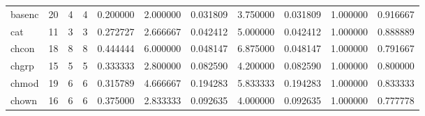 \begin{tabular}{lrrrrrrrrrr}
basenc    &                                      20 &                  4 &                                 4 &                                   0.200000 &                               2.000000 &                                     0.031809 &                          3.750000 &                                0.031809 &                           1.000000 &                                           0.916667 \\
cat       &                                      11 &                  3 &                                 3 &                                   0.272727 &                               2.666667 &                                     0.042412 &                          5.000000 &                                0.042412 &                           1.000000 &                                           0.888889 \\
chcon     &                                      18 &                  8 &                                 8 &                                   0.444444 &                               6.000000 &                                     0.048147 &                          6.875000 &                                0.048147 &                           1.000000 &                                           0.791667 \\
chgrp     &                                      15 &                  5 &                                 5 &                                   0.333333 &                               2.800000 &                                     0.082590 &                          4.200000 &                                0.082590 &                           1.000000 &                                           0.800000 \\
chmod     &                                      19 &                  6 &                                 6 &                                   0.315789 &                               4.666667 &                                     0.194283 &                          5.833333 &                                0.194283 &                           1.000000 &                                           0.833333 \\
chown     &                                      16 &                  6 &                                 6 &                                   0.375000 &                               2.833333 &                                     0.092635 &                          4.000000 &                                0.092635 &                           1.000000 &                                           0.777778 \\

\end{tabular}
